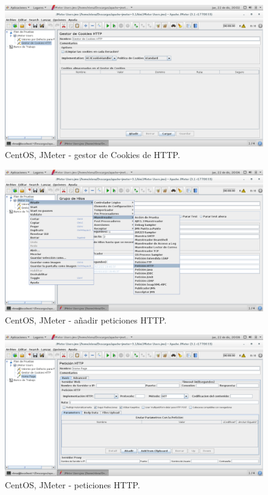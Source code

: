 \begin{figure}[H] 
	\centering
	\includegraphics[width=14.7cm]{./img/ejercicio4_6.png} 	
	\caption{CentOS, JMeter - gestor de Cookies de HTTP.} \label{fig:ejercicio4_6}
\end{figure}

\begin{figure}[H] 
	\centering
	\includegraphics[width=14.7cm]{./img/ejercicio4_7.png} 	
	\caption{CentOS, JMeter - añadir peticiones HTTP.} \label{fig:ejercicio4_7}
\end{figure}

\begin{figure}[H] 
	\centering
	\includegraphics[width=14.7cm]{./img/ejercicio4_8.png} 	
	\caption{CentOS, JMeter - peticiones HTTP.} \label{fig:ejercicio4_8}
\end{figure}

